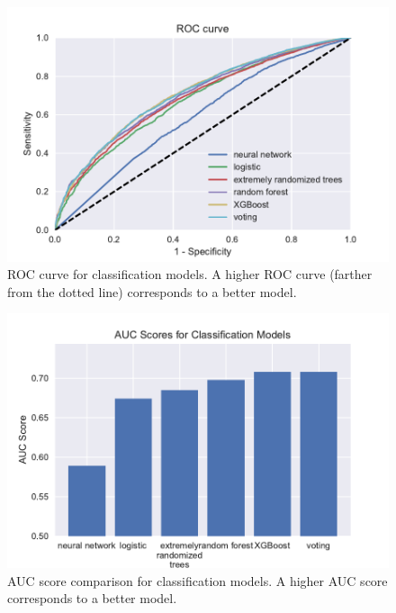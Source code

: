 \documentclass[12pt]{article}
\begin{document}
\begin{figure}[!htbp]
    \centering
    \includegraphics[width=\textwidth]{graphics/roc_curve}
    \caption{ROC curve for classification models. A higher ROC curve (farther from the dotted line) corresponds to a better model.}
    \label{fig:roc_curve}
\end{figure}

\begin{figure}[!htbp]
    \centering
    \includegraphics[width=\textwidth]{graphics/classification_auc}
    \caption{AUC score comparison for classification models. A higher AUC score corresponds to a better model.}
    \label{fig:auc}
\end{figure}
\end{document}
